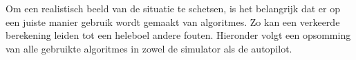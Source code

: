 
\\
\\
Om een realistisch beeld van de situatie te schetsen, is het belangrijk dat er op een juiste manier gebruik wordt gemaakt van algoritmes. Zo kan een verkeerde berekening leiden tot een heleboel andere fouten. Hieronder volgt een opsomming van alle gebruikte algoritmes in zowel de simulator als de autopilot.